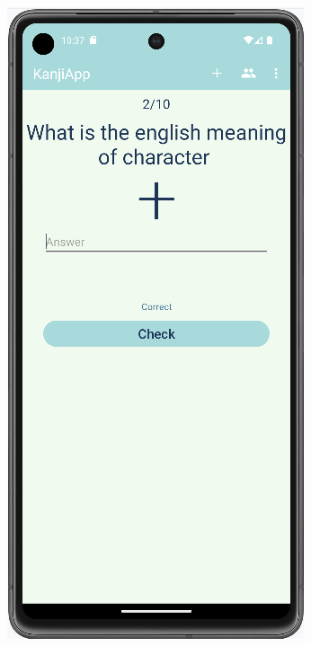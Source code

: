\documentclass[a4paper,twoside,12pt]{book}
\begin{document}
\begin{figure}
 
\begin{subfigure}{0.3\textwidth}
   \includegraphics[width=\textwidth]{learn/correct}

\end{subfigure}
\end{figure}
\end{document}

